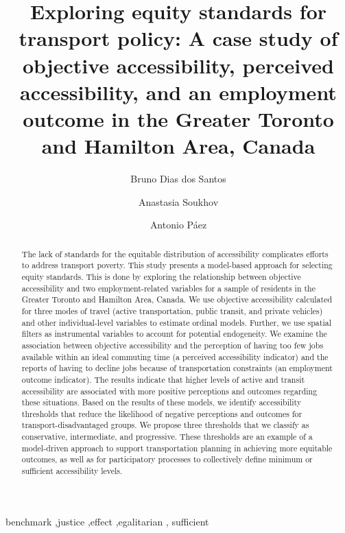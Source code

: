 \documentclass[preprint, 3p,
authoryear]{elsarticle} %
\begin{document}
\begin{frontmatter}

  \title{Exploring equity standards for transport policy: A case study
of objective accessibility, perceived accessibility, and an employment
outcome in the Greater Toronto and Hamilton Area, Canada}
    \author[McMaster University]{Bruno Dias dos Santos%
  }
    \author[Western University]{Anastasia Soukhov%
  }
    \author[McMaster University]{Antonio Páez%
  }
  
  \begin{abstract}
  The lack of standards for the equitable distribution of accessibility
  complicates efforts to address transport poverty. This study presents
  a model-based approach for selecting equity standards. This is done by
  exploring the relationship between objective accessibility and two
  employment-related variables for a sample of residents in the Greater
  Toronto and Hamilton Area, Canada. We use objective accessibility
  calculated for three modes of travel (active transportation, public
  transit, and private vehicles) and other individual-level variables to
  estimate ordinal models. Further, we use spatial filters as
  instrumental variables to account for potential endogeneity. We
  examine the association between objective accessibility and the
  perception of having too few jobs available within an ideal commuting
  time (a perceived accessibility indicator) and the reports of having
  to decline jobs because of transportation constraints (an employment
  outcome indicator). The results indicate that higher levels of active
  and transit accessibility are associated with more positive
  perceptions and outcomes regarding these situations. Based on the
  results of these models, we identify accessibility thresholds that
  reduce the likelihood of negative perceptions and outcomes for
  transport-disadvantaged groups. We propose three thresholds that we
  classify as conservative, intermediate, and progressive. These
  thresholds are an example of a model-driven approach to support
  transportation planning in achieving more equitable outcomes, as well
  as for participatory processes to collectively define minimum or
  sufficient accessibility levels.
  \end{abstract}
    \begin{keyword}
    benchmark \sep justice \sep effect \sep egalitarian \sep 
    sufficient
  \end{keyword}
  
 \end{frontmatter}
\end{document}
